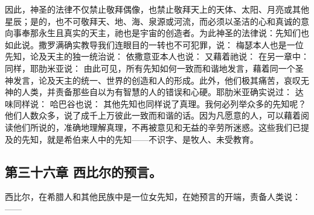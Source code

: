 因此，神圣的法律不仅禁止敬拜偶像，也禁止敬拜天上的天体、太阳、月亮或其他星辰；是的，也不可敬拜天、地、海、泉源或河流，而必须以圣洁的心和真诚的意向事奉那永生且真实的天主，祂也是宇宙的创造者。为此神圣的法律说：先知们也如此说。撒罗满确实教导我们连眼目的一转也不可犯罪，说：  梅瑟本人也是一位先知，论及天主的独一统治说：  依撒意亚本人也说：  又藉着祂说：  在另一章中：  同样，耶肋米亚说：  由此可见，所有先知如何一致而和谐地发言，藉着同一个圣神发言，论及天主的统一、世界的创造和人的形成。此外，他们极其痛苦，哀叹无神的人类，并责备那些自以为有智慧的人的错误和心硬。耶肋米亚确实说过：  达味同样说： 哈巴谷也说：  其他先知也同样说了真理。我何必列举众多的先知呢？他们人数众多，说了成千上万彼此一致而和谐的话。因为凡愿意的人，可以藉着阅读他们所说的，准确地理解真理，不再被意见和无益的辛劳所迷惑。这些我们已提及的先知，就是希伯来人中的先知——不识字、是牧人、未受教育。\par


\subsection{第三十六章 西比尔的预言。}

西比尔，在希腊人和其他民族中是一位女先知，在她预言的开端，责备人类说：——\par

